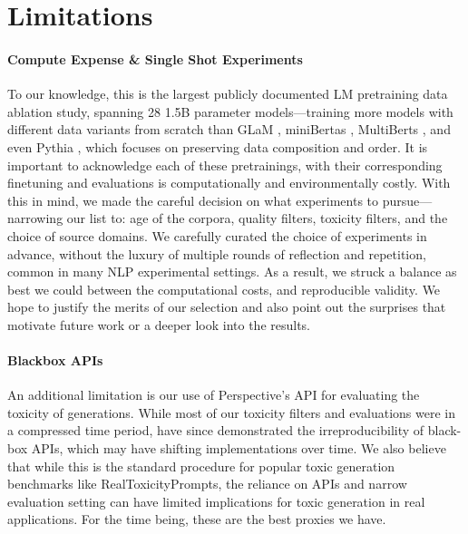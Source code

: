 \documentclass{article}
\begin{document}
\vspace{-3mm}
\section{Limitations}
\label{sec:limitations}

\vspace{-3mm}
\paragraph{Compute Expense \& Single Shot Experiments} To our knowledge, this is the largest publicly documented LM pretraining data ablation study, spanning 28 1.5B parameter models---training more models with different data variants from scratch than GLaM \citep{du_glam_2021}, miniBertas \citep{warstadt2020learning}, MultiBerts \citep{sellammultiberts}, and even Pythia \citep{biderman2023pythia}, which focuses on preserving data composition and order.
It is important to acknowledge each of these pretrainings, with their corresponding finetuning and evaluations is computationally and environmentally costly.
With this in mind, we made the careful decision on what experiments to pursue---narrowing our list to: age of the corpora, quality filters, toxicity filters, and the choice of source domains.
We carefully curated the choice of experiments in advance, without the luxury of multiple rounds of reflection and repetition, common in many NLP experimental settings.
As a result, we struck a balance as best we could between the computational costs, and reproducible validity.
We hope to justify the merits of our selection and also point out the surprises that motivate future work or a deeper look into the results.

\vspace{-3mm}
\paragraph{Blackbox APIs} An additional limitation is our use of Perspective's API  for evaluating the toxicity of generations.
While most of our toxicity filters and evaluations were in a compressed time period, \citet{pozzobon2023challenges} have since demonstrated the irreproducibility of black-box APIs, which may have shifting implementations over time.
We also believe that while this is the standard procedure for popular toxic generation benchmarks like RealToxicityPrompts, the reliance on APIs and narrow evaluation setting can have limited implications for toxic generation in real applications.
For the time being, these are the best proxies we have.
\end{document}
